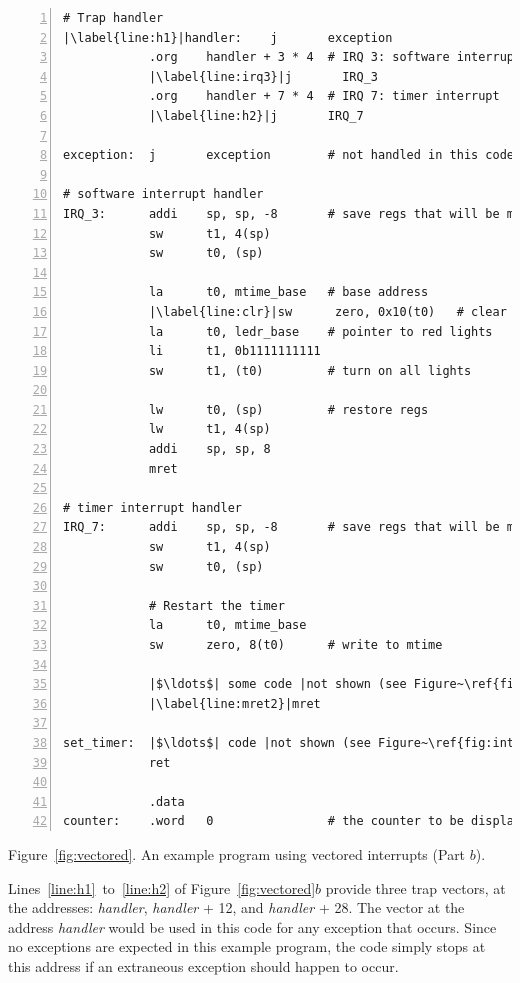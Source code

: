 \documentclass[11pt, twoside, pdftex]{article}
\begin{document}
\begin{center}
\begin{minipage}[h]{15 cm}
\begin{lstlisting}[style=defaultNiosVStyle, name=vecs, numbers=left, escapechar=|]
# Trap handler
|\label{line:h1}|handler:    j       exception
            .org    handler + 3 * 4  # IRQ 3: software interrupt
            |\label{line:irq3}|j       IRQ_3
            .org    handler + 7 * 4  # IRQ 7: timer interrupt
            |\label{line:h2}|j       IRQ_7

exception:  j       exception        # not handled in this code
            
# software interrupt handler
IRQ_3:      addi    sp, sp, -8       # save regs that will be modified
            sw      t1, 4(sp)
            sw      t0, (sp)

            la      t0, mtime_base   # base address
            |\label{line:clr}|sw      zero, 0x10(t0)   # clear software interrupt in msip
            la      t0, ledr_base    # pointer to red lights
            li      t1, 0b1111111111
            sw      t1, (t0)         # turn on all lights

            lw      t0, (sp)         # restore regs
            lw      t1, 4(sp)
            addi    sp, sp, 8
            mret

# timer interrupt handler
IRQ_7:      addi    sp, sp, -8       # save regs that will be modified
            sw      t1, 4(sp)
            sw      t0, (sp)
            
            # Restart the timer
            la      t0, mtime_base
            sw      zero, 8(t0)      # write to mtime

            |$\ldots$| some code |not shown (see Figure~\ref{fig:ints})|
            |\label{line:mret2}|mret

set_timer:  |$\ldots$| code |not shown (see Figure~\ref{fig:ints})|
            ret

            .data
counter:    .word   0                # the counter to be displayed
\end{lstlisting}

\vspace{0.25in}
Figure~\ref{fig:vectored}.	An example program using vectored interrupts (Part $b$).
\end{minipage}
\end{center}

Lines~\ref{line:h1}~to~\ref{line:h2} of Figure~\ref{fig:vectored}$b$ provide three
trap vectors, at the addresses: {\it handler}, {\it handler} + 12, and {\it handler} + 28.
The vector at the address {\it handler} would be used in this code for any exception that
occurs. Since no exceptions are expected in this example program, the code simply stops at
this address if an extraneous exception should happen to occur. 
\end{document}
